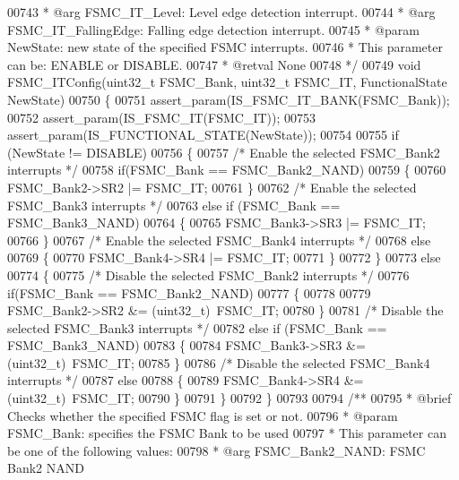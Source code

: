 \begin{DoxyCode}
00743 \textcolor{comment}{  *            @arg FSMC\_IT\_Level: Level edge detection interrupt.}
00744 \textcolor{comment}{  *            @arg FSMC\_IT\_FallingEdge: Falling edge detection interrupt.}
00745 \textcolor{comment}{  * @param  NewState: new state of the specified FSMC interrupts.}
00746 \textcolor{comment}{  *          This parameter can be: ENABLE or DISABLE.}
00747 \textcolor{comment}{  * @retval None}
00748 \textcolor{comment}{  */}
00749 \textcolor{keywordtype}{void} FSMC_ITConfig(uint32\_t FSMC\_Bank, uint32\_t FSMC\_IT, FunctionalState NewState)
00750 \{
00751   assert_param(IS\_FSMC\_IT\_BANK(FSMC\_Bank));
00752   assert_param(IS\_FSMC\_IT(FSMC\_IT));
00753   assert_param(IS\_FUNCTIONAL\_STATE(NewState));
00754 
00755   \textcolor{keywordflow}{if} (NewState != DISABLE)
00756   \{
00757     \textcolor{comment}{/* Enable the selected FSMC\_Bank2 interrupts */}
00758     \textcolor{keywordflow}{if}(FSMC\_Bank == FSMC_Bank2_NAND)
00759     \{
00760       FSMC_Bank2->SR2 |= FSMC\_IT;
00761     \}
00762     \textcolor{comment}{/* Enable the selected FSMC\_Bank3 interrupts */}
00763     \textcolor{keywordflow}{else} \textcolor{keywordflow}{if} (FSMC\_Bank == FSMC_Bank3_NAND)
00764     \{
00765       FSMC_Bank3->SR3 |= FSMC\_IT;
00766     \}
00767     \textcolor{comment}{/* Enable the selected FSMC\_Bank4 interrupts */}
00768     \textcolor{keywordflow}{else}
00769     \{
00770       FSMC_Bank4->SR4 |= FSMC\_IT;
00771     \}
00772   \}
00773   \textcolor{keywordflow}{else}
00774   \{
00775     \textcolor{comment}{/* Disable the selected FSMC\_Bank2 interrupts */}
00776     \textcolor{keywordflow}{if}(FSMC\_Bank == FSMC_Bank2_NAND)
00777     \{
00778 
00779       FSMC_Bank2->SR2 &= (uint32\_t)~FSMC\_IT;
00780     \}
00781     \textcolor{comment}{/* Disable the selected FSMC\_Bank3 interrupts */}
00782     \textcolor{keywordflow}{else} \textcolor{keywordflow}{if} (FSMC\_Bank == FSMC_Bank3_NAND)
00783     \{
00784       FSMC_Bank3->SR3 &= (uint32\_t)~FSMC\_IT;
00785     \}
00786     \textcolor{comment}{/* Disable the selected FSMC\_Bank4 interrupts */}
00787     \textcolor{keywordflow}{else}
00788     \{
00789       FSMC_Bank4->SR4 &= (uint32\_t)~FSMC\_IT;
00790     \}
00791   \}
00792 \}
00793 
00794 \textcolor{comment}{/**}
00795 \textcolor{comment}{  * @brief  Checks whether the specified FSMC flag is set or not.}
00796 \textcolor{comment}{  * @param  FSMC\_Bank: specifies the FSMC Bank to be used}
00797 \textcolor{comment}{  *          This parameter can be one of the following values:}
00798 \textcolor{comment}{  *            @arg FSMC\_Bank2\_NAND: FSMC Bank2 NAND }

\end{DoxyCode}

